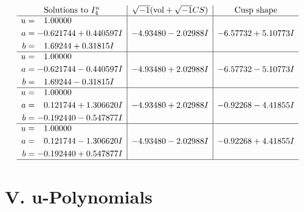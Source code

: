 \documentclass[1p]{elsarticle_modified}
\theoremstyle{definition}
\newcommand{\I}{\sqrt{-1}}
\begin{document}
$$\begin{array}{c|c|c}  
\text{Solutions to }I^u_{4}& \I (\text{vol} + \sqrt{-1}CS) & \text{Cusp shape}\\
 \hline 
\begin{aligned}
u &= \phantom{-}1.00000\phantom{ +0.000000I} \\
a &= -0.621744 + 0.440597 I \\
b &= \phantom{-}1.69244 + 0.31815 I\end{aligned}
 & -4.93480 - 2.02988 I & -6.57732 + 5.10773 I \\ \hline\begin{aligned}
u &= \phantom{-}1.00000\phantom{ +0.000000I} \\
a &= -0.621744 - 0.440597 I \\
b &= \phantom{-}1.69244 - 0.31815 I\end{aligned}
 & -4.93480 + 2.02988 I & -6.57732 - 5.10773 I \\ \hline\begin{aligned}
u &= \phantom{-}1.00000\phantom{ +0.000000I} \\
a &= \phantom{-}0.121744 + 1.306620 I \\
b &= -0.192440 - 0.547877 I\end{aligned}
 & -4.93480 + 2.02988 I & -0.92268 - 4.41855 I \\ \hline\begin{aligned}
u &= \phantom{-}1.00000\phantom{ +0.000000I} \\
a &= \phantom{-}0.121744 - 1.306620 I \\
b &= -0.192440 + 0.547877 I\end{aligned}
 & -4.93480 - 2.02988 I & -0.92268 + 4.41855 I\\
 \hline 
 \end{array}$$\newpage
\newpage\renewcommand{\arraystretch}{1}
\centering \section*{ V. u-Polynomials}
\end{document}
